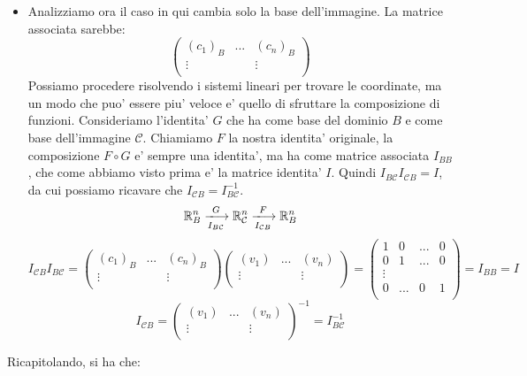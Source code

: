 \documentclass{report}
\begin{document}
\begin{itemize}
\item Analizziamo ora il caso in qui cambia solo la base dell'immagine. La matrice associata sarebbe:
  \[
  \begin{pmatrix}
    (c_1)_B & ... & (c_n)_B\\
  \vdots &  & \vdots\\
  \end{pmatrix}
  \]
    Possiamo procedere risolvendo i sistemi lineari per trovare le coordinate, ma un modo che puo' essere piu' veloce e' quello di sfruttare la composizione di funzioni. Consideriamo l'identita' $ G $ che ha come base del dominio $ B $ e come base dell'immagine $ \mathcal{C} $. Chiamiamo $ F $ la nostra identita' originale, la composizione $ F \circ G $ e' sempre una identita', ma ha come matrice associata $ I_{BB} $, che come abbiamo visto prima e' la matrice identita' $ I $. Quindi $ I_{B\mathcal{C}} I_{\mathcal{C}B} = I $, da cui possiamo ricavare che $ I_{\mathcal{C}B} = I_{B\mathcal{C}}^{-1} $.
    \[
      \mathbb{R}^n_B \xlongrightarrow[I_{B\mathcal{C}}]{G} \mathbb{R}^n_\mathcal{C} \xlongrightarrow[I_{\mathcal{C}B}]{F} \mathbb{R}^n_B
    \]
    \[
    I_{\mathcal{C}B}I_{B\mathcal{C}} = \begin{pmatrix}
      (c_1)_B & ... & (c_n)_B\\
    \vdots &  & \vdots\\
    \end{pmatrix} \begin{pmatrix}
      (v_1) & ... & (v_n)\\
    \vdots &  & \vdots\\
    \end{pmatrix} = \begin{pmatrix}
      1 & 0 & ... & 0\\
      0 & 1 & ... & 0\\
      \vdots &  & &\\
      0 & ... & 0 & 1\\
    \end{pmatrix} = I_{BB} = I
    \]
    \[
    I_{\mathcal{C}B} = \begin{pmatrix}
      (v_1) & ... & (v_n)\\
    \vdots &  & \vdots\\
    \end{pmatrix}^{-1} = I_{B\mathcal{C}}^{-1}
    \]
\end{itemize}
Ricapitolando, si ha che:
\end{document}
